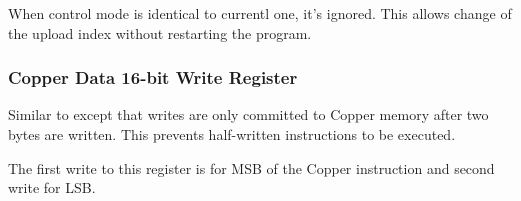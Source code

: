 \begin{NextPort}
\end{NextPort}

When control mode is identical to currentl one, it's ignored. This allows change of the upload index without restarting the program.


\subsubsection{Copper Data 16-bit Write Register }

\begin{NextPort}
\end{NextPort}

Similar to  except that writes are only committed to Copper memory after two bytes are written. This prevents half-written instructions to be executed.

The first write to this register is for MSB of the Copper instruction and second write for LSB.


\pagebreak
\IntentionallyEmpty
\pagebreak
